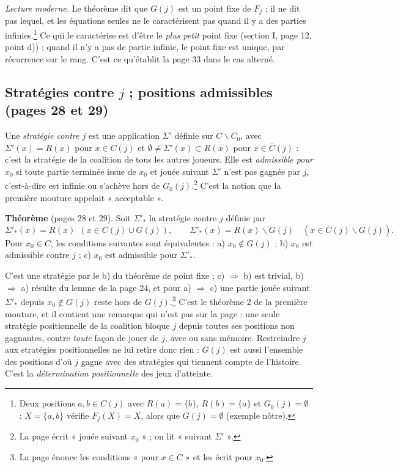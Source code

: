 \documentclass[11pt,a4paper]{article}
\begin{document}
\emph{Lecture moderne.} Le théorème dit que $G(j)$ est un point fixe de
$F_j$ ; il ne dit pas lequel, et les équations seules ne le caractérisent pas
quand il y a des parties infinies.\footnote{Deux positions $a, b \in C(j)$
avec $R(a) = \{b\}$, $R(b) = \{a\}$ et $G_0(j) = \emptyset$ : $X = \{a, b\}$
vérifie $F_j(X) = X$, alors que $G(j) = \emptyset$ (exemple nôtre).} Ce qui
le caractérise est d'être le \emph{plus petit} point fixe (section I, page 12,
point d)) ; quand il n'y a pas de partie infinie, le point fixe est unique,
par récurrence sur le rang. C'est ce qu'établit la page 33 dans le cas
alterné.

\subsection*{Stratégies contre $j$ ; positions admissibles (pages 28 et 29)}

Une \emph{stratégie contre $j$} est une application $\Sigma'$ définie sur
$C \smallsetminus C_0$, avec $\Sigma'(x) = R(x)$ pour $x \in C(j)$ et
$\emptyset \neq \Sigma'(x) \subset R(x)$ pour $x \in \overline{C}(j)$ :
c'est la stratégie de la coalition de tous les autres joueurs. Elle est
\emph{admissible pour $x_0$} si toute partie terminée issue de $x_0$ et
jouée suivant $\Sigma'$ n'est pas gagnée par $j$, c'est-à-dire est infinie
ou s'achève hors de $G_0(j)$.\footnote{La page écrit « jouée suivant
$x_0$ » ; on lit « suivant $\Sigma'$ ».} C'est la notion que la première
mouture appelait « acceptable ».

\textbf{Théorème} (pages 28 et 29). Soit $\Sigma'_*$ la stratégie contre $j$
définie par
\[
\Sigma'_*(x) = R(x) \ \ (x \in C(j) \cup G(j)),
\qquad
\Sigma'_*(x) = R(x) \smallsetminus G(j) \quad
(x \in \overline{C}(j) \smallsetminus G(j)).
\]
Pour $x_0 \in C$, les conditions suivantes sont équivalentes : a)
$x_0 \notin G(j)$ ; b) $x_0$ est admissible contre $j$ ; c) $x_0$ est
admissible pour $\Sigma'_*$.

C'est une stratégie par le b) du théorème de point fixe ; c)
$\Rightarrow$ b) est trivial, b) $\Rightarrow$ a) résulte du lemme de la page
24, et pour a) $\Rightarrow$ c) une partie jouée suivant $\Sigma'_*$ depuis
$x_0 \notin G(j)$ reste hors de $G(j)$.\footnote{La page énonce les conditions
« pour $x \in C$ » et les écrit pour $x_0$.} C'est le théorème 2 de la
première mouture, et il contient une remarque qui n'est pas sur la page : une
seule stratégie positionnelle de la coalition bloque $j$ depuis toutes ses
positions non gagnantes, contre \emph{toute} façon de jouer de $j$, avec ou
sans mémoire. Restreindre $j$ aux stratégies positionnelles ne lui retire donc
rien : $G(j)$ est aussi l'ensemble des positions d'où $j$ gagne avec des
stratégies qui tiennent compte de l'histoire. C'est la \emph{détermination
positionnelle} des jeux d'atteinte.
\end{document}
